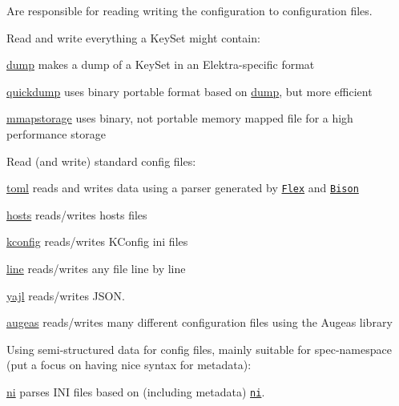 Are responsible for reading writing the configuration to configuration files.

Read and write everything a Key\+Set might contain\+:


\begin{DoxyItemize}
\item \hyperlink{autotoc_md191_src_plugins_dump_README_md}{dump} makes a dump of a Key\+Set in an Elektra-\/specific format
\item \hyperlink{autotoc_md526_src_plugins_quickdump_README_md}{quickdump} uses binary portable format based on \hyperlink{autotoc_md191_src_plugins_dump_README_md}{dump}, but more efficient
\item \hyperlink{autotoc_md398_src_plugins_mmapstorage_README_md}{mmapstorage} uses binary, not portable memory mapped file for a high performance storage
\end{DoxyItemize}

Read (and write) standard config files\+:


\begin{DoxyItemize}
\item \hyperlink{autotoc_md635_src_plugins_toml_README_md}{toml} reads and writes data using a parser generated by \href{https://github.com/westes/flex}{\tt Flex} and \href{https://www.gnu.org/software/bison}{\tt Bison}
\item \hyperlink{autotoc_md261_src_plugins_hosts_README_md}{hosts} reads/writes hosts files
\item \hyperlink{autotoc_md317_src_plugins_kconfig_README_md}{kconfig} reads/writes K\+Config ini files
\item \hyperlink{autotoc_md341_src_plugins_line_README_md}{line} reads/writes any file line by line
\item \hyperlink{autotoc_md777_src_plugins_yajl_README_md}{yajl} reads/writes J\+S\+ON.
\item \hyperlink{autotoc_md43_src_plugins_augeas_README_md}{augeas} reads/writes many different configuration files using the Augeas library
\end{DoxyItemize}

Using semi-\/structured data for config files, mainly suitable for spec-\/namespace (put a focus on having nice syntax for metadata)\+:


\begin{DoxyItemize}
\item \hyperlink{autotoc_md469_src_plugins_ni_README_md}{ni} parses I\+NI files based on (including metadata) \href{https://lab.burn.capital/chaz-attic/bohr/-/blob/main/include/bohr/ni.h}{\tt ni}.
\end{DoxyItemize}

